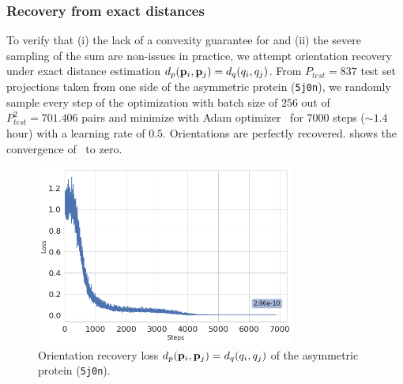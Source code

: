 \subsubsection{Recovery from exact distances}\label{sec:results:orientation-recovery:exact}


To verify that (i) the lack of a convexity guarantee for  and (ii) the severe sampling of the sum are non-issues in practice, we attempt orientation recovery under exact distance estimation $d_p(\mathbf{p}_i, \mathbf{p}_j) = d_q(q_i, q_j)$.
From $P_{test}=837$ test set projections taken from one side of the asymmetric protein (\texttt{5j0n}), we randomly sample every step of the optimization with batch size of $256$ out of $P_{test}^2 = \num{701,406}$ pairs and minimize  with Adam optimizer~\cite{kingma2014adam} for $\num{7000}$ steps ($\sim 1.4$ hour) with a learning rate of $0.5$.
Orientations are perfectly recovered.
 shows the convergence of~ to zero.

\begin{figure}[b]
    \centering
        \includegraphics[height=5.9cm]{images/5j0n_perfect_angle_recovery.png}
    \caption{Orientation recovery loss $d_p(\mathbf{p}_i, \mathbf{p}_j) = d_q(q_i, q_j)$ of the asymmetric protein (\texttt{5j0n}).} %
    \label{fig:5j0n-orientation-recovery-loss}
\end{figure}

